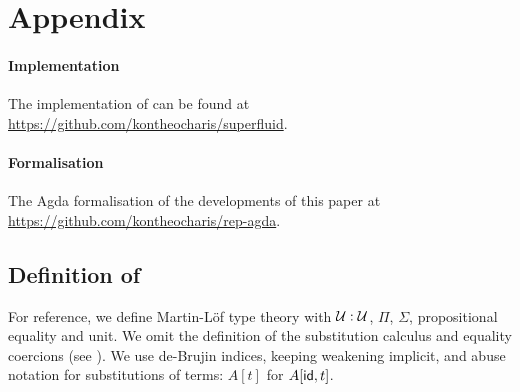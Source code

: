 \clearpage
\section{Appendix}

\allowdisplaybreaks

\paragraph{Implementation}

The implementation of \superfluid can be found at \url{https://github.com/kontheocharis/superfluid}.

\paragraph{Formalisation} \label{app:formalisation}

The Agda formalisation of the developments of this paper at \url{https://github.com/kontheocharis/rep-agda}.

\subsection{Definition of \lambdamltt}

For reference, we define Martin-Löf type theory with $\mathcal{U} :
\mathcal{U}$, $\Pi$, $\Sigma$, propositional equality and unit. We omit the
definition of the substitution calculus and equality coercions
(see \cite[5.1.2]{Castellan2019-qo}). We use de-Brujin indices, keeping weakening
implicit, and abuse notation for substitutions of terms: $A[t]$ for $A[\textsf{id},
t]$.

\newcommand{\refl}{\mta{refl}}
\newcommand{\fst}{\mta{fst}}
\newcommand{\snd}{\mta{snd}}
\newcommand{\pair}{\mta{pair}}
\newcommand{\app}{\mta{app}}
\newcommand{\lam}{\mta{lam}}
\newcommand{\J}{\mta{J}}


